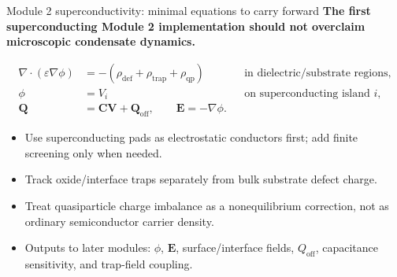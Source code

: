 \documentclass[aspectratio=169,10pt]{beamer}
\begin{document}
\begin{frame}{Module 2 superconductivity: minimal equations to carry forward}
\footnotesize
\textbf{The first superconducting Module 2 implementation should not overclaim microscopic condensate dynamics.}

\vspace{-0.2em}
\begin{align*}
\nabla\cdot(\varepsilon\nabla\phi)&=-\left(\rho_{\mathrm{def}}+\rho_{\mathrm{trap}}+\rho_{\mathrm{qp}}\right)
&&\text{in dielectric/substrate regions},\\[-0.05em]
\phi&=V_i
&&\text{on superconducting island }i,\\[-0.05em]
\mathbf Q&=\mathbf C\mathbf V+\mathbf Q_{\mathrm{off}},
\qquad
\mathbf E=-\nabla\phi.
\end{align*}

\vspace{-0.25em}
\begin{itemize}
    \item Use superconducting pads as electrostatic conductors first; add finite screening only when needed.
    \item Track oxide/interface traps separately from bulk substrate defect charge.
    \item Treat quasiparticle charge imbalance as a nonequilibrium correction, not as ordinary semiconductor carrier density.
    \item Outputs to later modules: $\phi$, $\mathbf E$, surface/interface fields, $Q_{\mathrm{off}}$, capacitance sensitivity, and trap-field coupling.
\end{itemize}
\end{frame}
\end{document}
